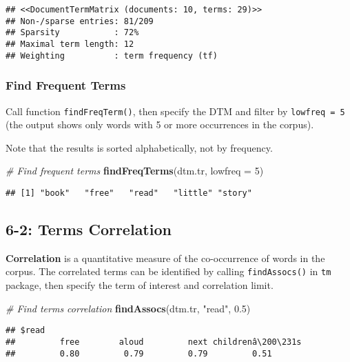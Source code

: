 \documentclass[
]{article}
\newenvironment{Shaded}{\begin{snugshade}}{\end{snugshade}}
\newcommand{\CommentTok}[1]{\textcolor[rgb]{0.56,0.35,0.01}{\textit{#1}}}
\newcommand{\DataTypeTok}[1]{\textcolor[rgb]{0.13,0.29,0.53}{#1}}
\newcommand{\DecValTok}[1]{\textcolor[rgb]{0.00,0.00,0.81}{#1}}
\newcommand{\FloatTok}[1]{\textcolor[rgb]{0.00,0.00,0.81}{#1}}
\newcommand{\KeywordTok}[1]{\textcolor[rgb]{0.13,0.29,0.53}{\textbf{#1}}}
\newcommand{\NormalTok}[1]{#1}
\newcommand{\StringTok}[1]{\textcolor[rgb]{0.31,0.60,0.02}{#1}}
\begin{document}
\begin{verbatim}
## <<DocumentTermMatrix (documents: 10, terms: 29)>>
## Non-/sparse entries: 81/209
## Sparsity           : 72%
## Maximal term length: 12
## Weighting          : term frequency (tf)
\end{verbatim}

\hypertarget{find-frequent-terms}{%
\subsubsection{Find Frequent Terms}\label{find-frequent-terms}}

Call function \texttt{findFreqTerm()}, then specify the DTM and filter
by \texttt{lowfreq\ =\ 5} (the output shows only words with 5 or more
occurrences in the corpus).

Note that the results is sorted alphabetically, not by frequency.

\begin{Shaded}
\begin{Highlighting}[]
\CommentTok{# Find frequent terms}
\KeywordTok{findFreqTerms}\NormalTok{(dtm.tr, }\DataTypeTok{lowfreq =} \DecValTok{5}\NormalTok{)}
\end{Highlighting}
\end{Shaded}

\begin{verbatim}
## [1] "book"   "free"   "read"   "little" "story"
\end{verbatim}

\hypertarget{terms-correlation}{%
\subsection{6-2: Terms Correlation}\label{terms-correlation}}

\textbf{Correlation} is a quantitative measure of the co-occurrence of
words in the corpus. The correlated terms can be identified by calling
\texttt{findAssocs()} in \texttt{tm} package, then specify the term of
interest and correlation limit.

\begin{Shaded}
\begin{Highlighting}[]
\CommentTok{# Find terms correlation}
\KeywordTok{findAssocs}\NormalTok{(dtm.tr, }\StringTok{"read"}\NormalTok{, }\FloatTok{0.5}\NormalTok{)}
\end{Highlighting}
\end{Shaded}

\begin{verbatim}
## $read
##         free        aloud         next childrenâ\200\231s 
##         0.80         0.79         0.79         0.51
\end{verbatim}
\end{document}
